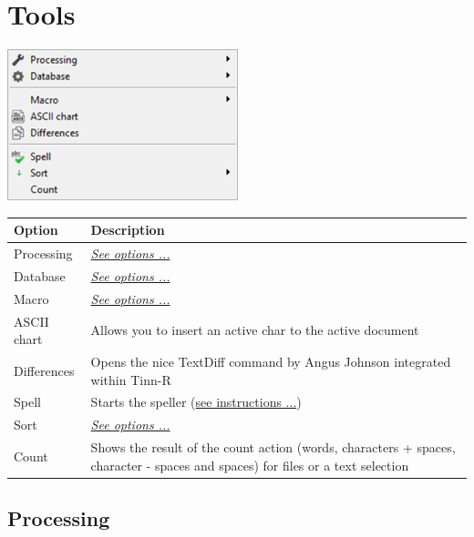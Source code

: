 
\hypertarget{menu_tools}{}
\section{Tools}

\includegraphics[scale=0.50]{./res/menu_tools.png}\\

\begin{scriptsize}
  \begin{tabularx}{\textwidth}{>{\hsize=0.2\hsize}X>{\hsize=0.8\hsize}X}\\
    \hline
    \textbf{Option} & \textbf{Description} \\
    \hline
    Processing & \textit{\href{\#menu\_tools\_processing}{See options ...}} \\
    Database & \textit{\href{\#menu\_tools\_database}{See options ...}} \\
    \hdashline[1pt/1pt]
    Macro & \textit{\href{\#menu\_tools\_macro}{See options ...}} \\
    ASCII chart & Allows you to insert an active char to the active document \\
    Differences & Opens the nice TextDiff command by Angus Johnson integrated within Tinn-R \\
    \hdashline[1pt/1pt]
    Spell & Starts the speller (\href{\#working\_tools\_spell}{see instructions ...}) \\
    Sort & \textit{\href{\#menu\_tools\_sort}{See options ...}} \\
    Count & Shows the result of the count action
     (words, characters + spaces, character - spaces and spaces) for files or a text selection \\
    \hline
  \end{tabularx}
\end{scriptsize}

\hypertarget{menu_tools_processing}{}
\subsection{Processing}

